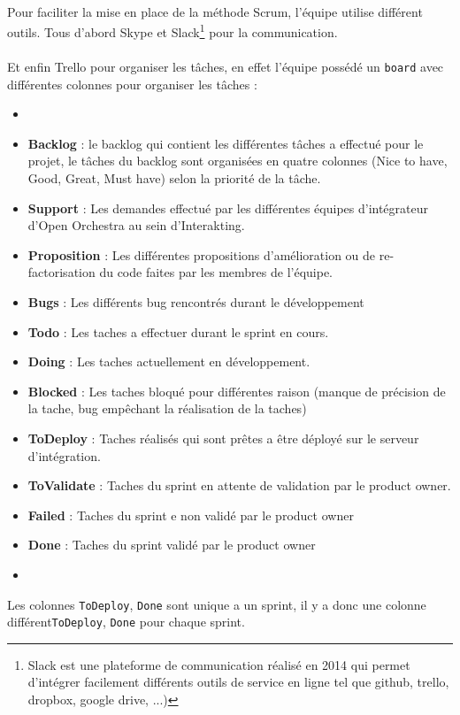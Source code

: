 \paragraph{}
 Pour faciliter la mise en place de la méthode Scrum, l'équipe utilise différent outils.
 Tous d'abord Skype et Slack\footnote{Slack est une plateforme de communication réalisé en 2014 qui permet d'intégrer facilement différents outils de service en ligne tel que github, trello, dropbox, google drive, ...)} pour la communication.
  \paragraph{}
 Et enfin Trello pour organiser les tâches, en effet l'équipe possédé un \verb?board? avec différentes colonnes pour organiser les tâches : 
 \begin{itemize}
 \item[]
 \item \textbf{Backlog} : le backlog qui contient les différentes tâches a effectué pour le projet, le tâches du backlog sont organisées en quatre colonnes (Nice to have, Good, Great, Must have) selon la priorité de la tâche.
 \item \textbf{Support} : Les demandes effectué par les différentes équipes d'intégrateur d'Open Orchestra au sein d'Interakting.
 \item \textbf{Proposition} : Les différentes propositions d'amélioration ou de re- factorisation du code faites par les membres de l'équipe.
 \item \textbf{Bugs} : Les différents bug rencontrés durant le développement
 \item \textbf{Todo} : Les taches a effectuer durant le sprint en cours.
 \item \textbf{Doing} : Les taches actuellement en développement.
 \item \textbf{Blocked} : Les taches bloqué pour différentes raison (manque de précision de la tache, bug empêchant la réalisation de la taches)
 \item \textbf{ToDeploy} : Taches réalisés qui sont prêtes a être déployé sur le serveur d'intégration.
 \item \textbf{ToValidate} : Taches du sprint en attente de validation par le product owner.
 \item \textbf{Failed} : Taches du sprint e non validé par le product owner
 \item \textbf{Done} : Taches du sprint validé par le product owner
 \item[]
 \end{itemize}
Les colonnes \verb?ToDeploy?, \verb?Done? sont unique a un sprint, il y a donc une colonne  différent\verb?ToDeploy?, \verb?Done? pour chaque sprint.
